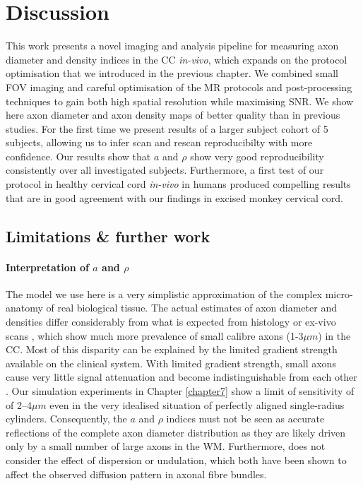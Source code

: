 \section{Discussion}
This work presents a novel imaging and analysis pipeline for measuring axon diameter and density indices in the \gls{CC} \emph{in-vivo}, which expands on the \SFasym{} protocol optimisation that we introduced in the previous chapter. We combined small \gls{FOV} imaging and careful optimisation of the MR protocols and post-processing techniques to gain both high spatial resolution while maximising \gls{SNR}. We show here axon diameter and axon density maps of better quality than in previous studies. For the first time we present results of a larger subject cohort of 5 subjects, allowing us to infer scan and rescan reproducibilty with more confidence. Our results show that $a$ and $\rho$ show very good reproducibility consistently over all investigated subjects. Furthermore, a first test of our protocol in healthy cervical cord \emph{in-vivo} in humans produced compelling results that are in good agreement with our findings in excised monkey cervical cord.

\subsection{Limitations \& further work}
\paragraph{Interpretation of $a$ and $\rho$}The model we use here is a very simplistic approximation of the complex micro-anatomy of real biological tissue. The actual estimates of axon diameter and densities differ considerably from what is expected from histology or ex-vivo scans \citep{Alexander:2010}, which show much more prevalence of small calibre axons (1-3$\mu m$) in the \gls{CC}. Most of this disparity can be explained by the limited gradient strength available on the clinical system.  With limited gradient strength, small axons cause very little signal attenuation and become indistinguishable from each other \citep{Latt:2007,Yeh:2010}. Our simulation experiments in Chapter \ref{chapter7} show a limit of sensitivity of of 2--4$\mu m$ even in the very idealised situation of perfectly aligned single-radius cylinders. Consequently, the $a$ and $\rho$ indices must not be seen as accurate reflections of the complete axon diameter distribution as they are likely driven only by a small number of large axons in the WM. Furthermore, does not consider the effect of dispersion\citep{Zhang:2011} or undulation\citep{Nilsson:2012}, which both have been shown to affect the observed diffusion pattern in axonal fibre bundles. 

